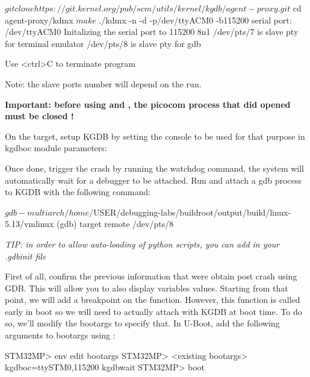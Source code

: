 \begin{bashinput}
$ git clone https://git.kernel.org/pub/scm/utils/kernel/kgdb/agent-proxy.git
$ cd agent-proxy/kdmx
$ make
$ ./kdmx -n -d -p/dev/ttyACM0 -b115200
serial port: /dev/ttyACM0
Initalizing the serial port to 115200 8n1
/dev/pts/7 is slave pty for terminal emulator
/dev/pts/8 is slave pty for gdb

Use <ctrl>C to terminate program
\end{bashinput}

Note: the slave ports number will depend on the run.

\textbf{Important: before using  and , the
picocom process that did opened  must be closed !}

On the target, setup KGDB by setting the console to be used for that purpose in
kgdboc module parameters:


Once done, trigger the crash by running the watchdog command, the system will
automatically wait for a debugger to be attached. Run  and
attach a gdb process to KGDB with the following command:

\begin{bashinput}
$ gdb-multiarch /home/$USER/debugging-labs/buildroot/output/build/linux-5.13/vmlinux
(gdb) target remote /dev/pts/8
\end{bashinput}

{\em TIP: in order to allow auto-loading of python scripts, you can add
 in your .gdbinit file}

First of all, confirm the previous information that were obtain post crash using
GDB. This will allow you to also display variables values. Starting from that
point, we will add a breakpoint on the  function.
However, this function is called early in boot so we will need to actually
attach with KGDB at boot time. To do so, we'll modify the bootargs to specify
that. In U-Boot, add the following arguments to bootargs using :

\begin{bashinput}
STM32MP> env edit bootargs
STM32MP> <existing bootargs> kgdboc=ttySTM0,115200 kgdbwait
STM32MP> boot
\end{bashinput}

